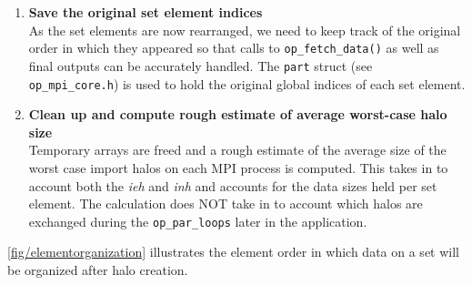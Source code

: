 \documentclass[11pt]{article}
\begin{document}
\begin{enumerate}
\item \textbf{Save the original set element indices}\\
As the set elements are now rearranged, we need to keep track of the original order in which they appeared so that calls
to \texttt{op\_fetch\_data()} as well as final outputs can be accurately handled. The \texttt{part} struct
(see \texttt{op\_mpi\_core.h}) is used to hold the original global indices of each set element.

\item \textbf{Clean up and compute rough estimate of average worst-case halo
size}\\
Temporary arrays are freed and a rough estimate of the average size of
the worst case import halos on each MPI process is computed. This takes in to
account both the \textit{ieh} and \textit{inh} and accounts for the data sizes
held per set element. The calculation does NOT take in to account which halos
are exchanged during the \texttt{op\_par\_loops} later in the application.
\end{enumerate}
\noindent \figurename{ \ref{fig/elementorganization}} illustrates the element
order in which data on a set will be organized after halo creation.


\end{document}
